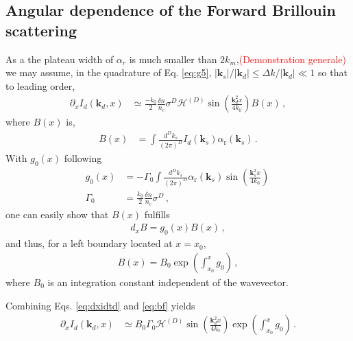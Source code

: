 \documentclass[
 reprint,
 amsmath,amssymb,
 aps,
]{revtex4-1}
\begin{document}
 \subsection{Angular dependence of the  Forward Brillouin scattering}
As a the plateau width of $\alpha_r$ is much smaller than $2k_m$,\textcolor{red}{(Demonstration generale)}  we may assume, in the quadrature of Eq. \eqref{eq:g5},   $ \vert\mathbf{k}_s \vert/\vert\mathbf{k}_d\vert \le\Delta k/ \vert\mathbf{k}_d\vert \ll 1$ so that to leading order,
\begin{align}
\partial_xI_d(\mathbf{k}_d,x)&\simeq  \frac{-k_0}{2} \frac{ \delta n}{n_c}   \sigma^D 
 \mathcal{H}^{(D)}\sin\left({\frac{ \mathbf{k}_d^2x}{4k_0}}  \right)
B(x)
\, , \label{eq:dxidtd}
\end{align}
where $B(x)$ is,
\begin{align}
B(x)&=
 \int \frac{d^Dk_s}{(2\pi)^D}    I_d(\mathbf{k}_s) \alpha_\mathrm{r}(\mathbf{k}_s) 
\, . \label{eq:b}
\end{align}
With $g_0(x)$ following
\begin{align}
g_0(x)&= -\Gamma_0 \int \frac{d^Dk_s}{(2\pi)^D}  \alpha_\mathrm{r}(\mathbf{k}_s) 
\sin\left(\frac{ \mathbf{k}_s^2x}{4k_0}  \right)\,  \nonumber\\
\Gamma_0&=\frac{k_0}{2}  \frac{\delta n}{n_c}
  \sigma^D \, ,
\label{eq:gain0}
\end{align}
one can easily show that $B(x)$ fulfills 
\begin{align}
d_xB = g_0(x) B(x)\, ,
\label{eq:db}
\end{align} 
and thus, for a left boundary located at $x=x_0$,
\begin{align}
B(x) = B_0\exp\left(\int_{x_0}^x g_0 \right)\, ,
\label{eq:bf}
\end{align} 
where $B_0$ is an integration constant independent of the wavevector.

Combining Eqs.  \eqref{eq:dxidtd} and \eqref{eq:bf} yields 
\begin{align}
\partial_xI_d(\mathbf{k}_d,x)&\simeq B_0\Gamma_0
 \mathcal{H}^{(D)}\sin\left({\frac{ \mathbf{k}_d^2x}{4k_0}}  \right)
\exp\left(\int_{x_0}^x g_0 \right)
\, . \label{eq:dxidtdf}
\end{align}
\end{document}
